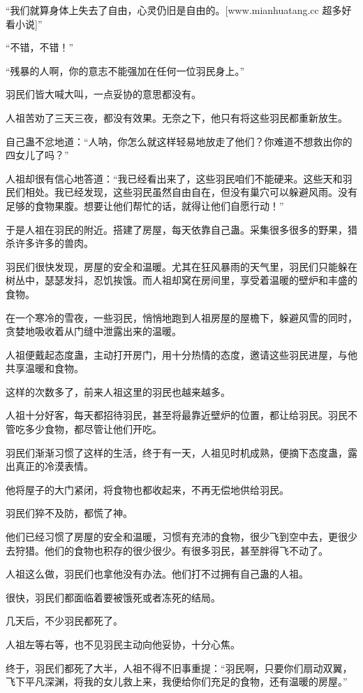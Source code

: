 \begin{this_body}
“我们就算身体上失去了自由，心灵仍旧是自由的。[www.mianhuatang.cc 超多好看小说]”

“不错，不错！”

“残暴的人啊，你的意志不能强加在任何一位羽民身上。”

羽民们皆大喊大叫，一点妥协的意思都没有。

人祖苦劝了三天三夜，都没有效果。无奈之下，他只有将这些羽民都重新放生。

自己蛊不忿地道：“人呐，你怎么就这样轻易地放走了他们？你难道不想救出你的四女儿了吗？”

人祖却很有信心地答道：“我已经看出来了，这些羽民咱们不能硬来。这些天和羽民们相处。我已经发现，这些羽民虽然自由自在，但没有巢穴可以躲避风雨。没有足够的食物果腹。想要让他们帮忙的话，就得让他们自愿行动！”

于是人祖在羽民的附近。搭建了房屋，每天依靠自己蛊。采集很多很多的野果，猎杀许多许多的兽肉。

羽民们很快发现，房屋的安全和温暖。尤其在狂风暴雨的天气里，羽民们只能躲在树丛中，瑟瑟发抖，忍饥挨饿。而人祖却窝在房间里，享受着温暖的壁炉和丰盛的食物。

在一个寒冷的雪夜，一些羽民，悄悄地跑到人祖房屋的屋檐下，躲避风雪的同时，贪婪地吸收着从门缝中泄露出来的温暖。

人祖便戴起态度蛊，主动打开房门，用十分热情的态度，邀请这些羽民进屋，与他共享温暖和食物。

这样的次数多了，前来人祖这里的羽民也越来越多。

人祖十分好客，每天都招待羽民，甚至将最靠近壁炉的位置，都让给羽民。羽民不管吃多少食物，都尽管让他们开吃。

羽民们渐渐习惯了这样的生活，终于有一天，人祖见时机成熟，便摘下态度蛊，露出真正的冷漠表情。

他将屋子的大门紧闭，将食物也都收起来，不再无偿地供给羽民。

羽民们猝不及防，都慌了神。

他们已经习惯了房屋的安全和温暖，习惯有充沛的食物，很少飞到空中去，更很少去狩猎。他们的食物也积存的很少很少。有很多羽民，甚至胖得飞不动了。

人祖这么做，羽民们也拿他没有办法。他们打不过拥有自己蛊的人祖。

很快，羽民们都面临着要被饿死或者冻死的结局。

几天后，不少羽民都死了。

人祖左等右等，也不见羽民主动向他妥协，十分心焦。

终于，羽民们都死了大半，人祖不得不旧事重提：“羽民啊，只要你们扇动双翼，飞下平凡深渊，将我的女儿救上来，我便给你们充足的食物，还有温暖的房屋。”


\end{this_body}
